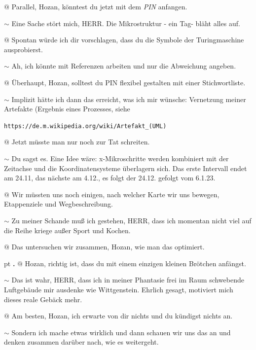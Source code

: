 \documentclass[10pt,a4paper]{article}
\newcounter{notec}
\newcommand\notep[1]{%
  \stepcounter{notec}
  \vskip #1pt
  {\bf\arabic{notec}.}
}
\begin{document}
\begin{mdframed}[style=daystyle]
  \vskip 2pt
  $@$ Parallel, Hozan, könntest du jetzt mit dem {\it PIN} anfangen.

  \vskip 2pt
  $\sim$ Eine Sache stört mich, HERR. Die Mikrostruktur - ein Tag- bläht alles
  auf.

  \vskip 2pt
  $@$ Spontan würde ich dir vorschlagen, dass du die Symbole der Turingmaschine
  ausprobierst.

  \vskip 2pt
  $\sim$ Ah, ich könnte mit Referenzen arbeiten und nur die Abweichung angeben.

  \vskip 2pt
  $@$ Überhaupt, Hozan, solltest du PIN flexibel gestalten mit einer
  Stichwortliste.

  \vskip 2pt
  $\sim$ Implizit hätte ich dann das erreicht, was ich mir wünsche: Vernetzung
  meiner Artefakte (Ergebnis eines Prozesses, siehe

  \verb+https://de.m.wikipedia.org/wiki/Artefakt_(UML)+

  \vskip 2pt
  $@$ Jetzt müsste man nur noch zur Tat schreiten.

  \vskip 2pt
  $\sim$ Du sagst es. Eine Idee wäre: x-Mikroschritte werden kombiniert mit der
  Zeitachse und die Koordinatensysteme überlagern sich. Das erste Intervall
  endet am 24.11, das nächste am 4.12., es folgt der 24.12. gefolgt vom 6.1.23.

  \vskip 2pt
  $@$ Wir müssten uns noch einigen, nach welcher Karte wir uns bewegen,
  Etappenziele und Wegbeschreibung.

  \vskip 2pt
  $\sim$ Zu meiner Schande muß ich gestehen, HERR, dass ich momentan nicht viel
  auf die Reihe kriege außer Sport und Kochen.

  \vskip 2pt
  $@$ Das untersuchen wir zusammen, Hozan, wie man das optimiert.

  \notep 4 $@$ Hozan, richtig ist, dass du mit einem einzigen kleinen Brötchen
  anfängst.

  \vskip 2pt
  $\sim$ Das ist wahr, HERR, dass ich in meiner Phantasie frei im Raum
  schwebende Luftgebäude mir ausdenke wie Wittgenstein. Ehrlich gesagt,
  motiviert mich dieses reale Gebäck mehr.

  \vskip 2pt
  $@$ Am besten, Hozan, ich erwarte von dir nichts und du kündigst nichts an.

  \vskip 2pt
  $\sim$ Sondern ich mache etwas wirklich und dann schauen wir uns das an und
  denken zusammen darüber nach, wie es weitergeht.

\end{mdframed}
\end{document}
